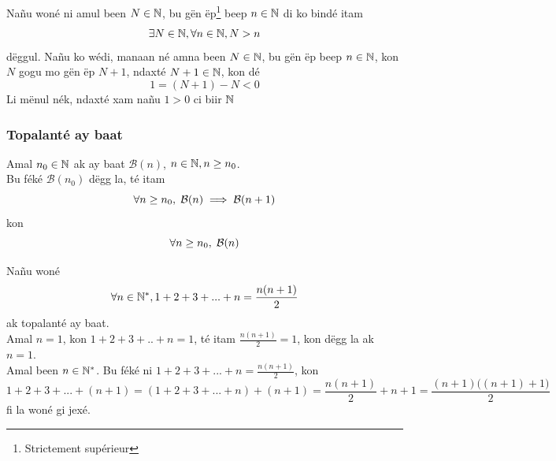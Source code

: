 \documentclass[twoside, a4paper]{article}
\begin{document}
Nañu woné ni amul been $N \in \mathbb{N}$, bu gën ëp\footnote{Strictement supérieur} beep $n \in \mathbb{N}$ di ko bindé itam $$\exists N \in \mathbb{N}, \forall n \in \mathbb{N}, N > n$$
dëggul. Nañu ko wédi, manaan né amna been $N \in \mathbb{N}$, bu gën ëp beep $n \in \mathbb{N}$, kon $N$  gogu mo gën ëp $N+1$, ndaxté $N+1 \in \mathbb{N}$, kon dé $$1 = (N+1) - N < 0$$
Li mënul nék, ndaxté xam nañu $1 > 0$ ci biir $\mathbb{N}$

\subsubsection{Topalanté ay baat}

\begin{tcolorbox}[enhanced jigsaw,breakable,pad at break*=1mm, colback=red!5!white,colframe=white!75!black,title= Téeki,watermark color=white]
Amal $n_0 \in \mathbb{N}$ ak ay baat $\mathcal{B}(n)$, $n \in \mathbb{N}, n \geq n_0$.\\
Bu féké $\mathcal{B}(n_0)$ dëgg la, té itam 
$$\forall n\geq n_0, \hspace{0.1cm}\mathcal{B}(n) \implies \mathcal{B}(n+1)$$ 
kon 
$$\forall n \geq n_0, \hspace{0.1cm} \mathcal{B}(n)$$
\end{tcolorbox}

Nañu woné $$\forall n \in \mathbb{N}^{*}, 1+2+3+...+n=\frac{n(n+1)}{2}$$
ak topalanté ay baat.\\
Amal $n=1$, kon $1+2+3+..+n=1$, té itam $\frac{n(n+1)}{2} = 1$, kon dëgg la ak $n=1$.\\
Amal been $n \in \mathbb{N}^{*}$. Bu féké ni $1+2+3+...+n=\frac{n(n+1)}{2}$, kon 
$$1+2+3+...+(n+1) = (1+2+3+...+n)+(n+1) = \frac{n(n+1)}{2} + n+1 = \frac{(n+1)\big((n+1)+1\big)}{2}$$
fi la woné gi jexé.
\end{document}

